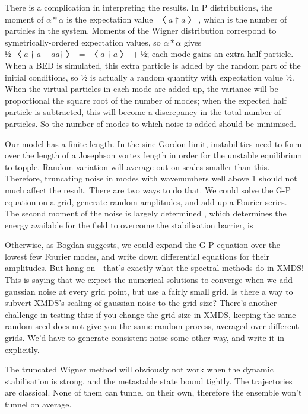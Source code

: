 There is a complication in interpreting the results.  In P distributions, the moment of $α*α$ is the expectation value $〈a†a〉$, which is the number of particles in the system.  Moments of the Wigner distribution correspond to symetrically-ordered expectation values, so $α*α$ gives $½〈a†a+aa†〉=〈a†a〉+½$; each mode gains an extra half particle.  When a BED is simulated, this extra particle is added by the random part of the initial conditions, so $½$ is actually a random quantity with expectation value $½$.  When the virtual particles in each mode are added up, the variance will be proportional the square root of the number of modes; when the expected half particle is subtracted, this will become a discrepancy in the total number of particles.  So the number of modes to which noise is added should be minimised.

Our model has a finite length.  In the sine-Gordon limit, instabilities need to form over the length of a Josephson vortex length in order for the unstable equilibrium to topple.  Random variation will average out on scales smaller than this.  Therefore, truncating noise in modes with wavenumbers well above 1 should not much affect the result.  There are two ways to do that.  We could solve the G-P equation on a grid, generate random amplitudes, and add up a Fourier series.  The second moment of the noise is largely determined , which determines the energy available for the field to overcome the stabilisation barrier, is 

Otherwise, as Bogdan suggests, we could expand the G-P equation over the lowest few Fourier modes, and write down differential equations for their amplitudes.  But hang on—that's exactly what the spectral methods do in XMDS!  This is saying that we expect the numerical solutions to converge when we add gaussian noise at every grid point, but use a fairly small grid.  Is there a way to subvert XMDS's scaling of gaussian noise to the grid size?  There's another challenge in testing this: if you change the grid size in XMDS, keeping the same random seed does not give you the same random process, averaged over different grids.  We'd have to generate consistent noise some other way, and write it in explicitly.

The truncated Wigner method will obviously not work when the dynamic stabilisation is strong, and the metastable state bound tightly.  The trajectories are classical.  None of them can tunnel on their own, therefore the ensemble won't tunnel on average.



